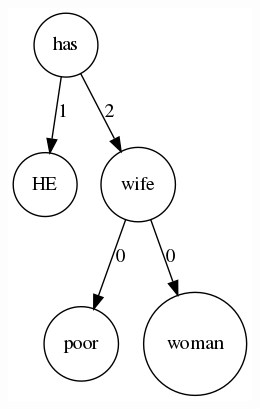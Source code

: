 \documentclass[bigger]{beamer}
\begin{document}
\begin{frame}
\begin{columns}
\begin{column}{0.3\textwidth}
	\pause \includegraphics[scale=0.4]{pics/wifeexp.png}
	\end{column}
\end{columns}

\end{frame}
\end{document}
